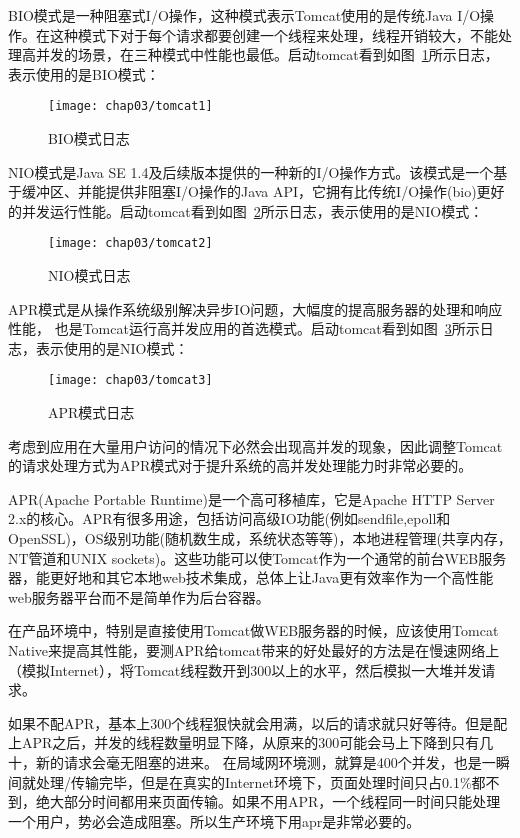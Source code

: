 BIO模式是一种阻塞式I/O操作，这种模式表示Tomcat使用的是传统Java I/O操作。在这种模式下对于每个请求都要创建一个线程来处理，线程开销较大，不能处理高并发的场景，在三种模式中性能也最低。启动tomcat看到如图~\ref{fig:tomcat1}所示日志，表示使用的是BIO模式：
\begin{figure}[H] %
  \centering
  \texttt{[image: chap03/tomcat1]}
  \caption{BIO模式日志}
  \label{fig:tomcat1}
\end{figure}
NIO模式是Java SE 1.4及后续版本提供的一种新的I/O操作方式。该模式是一个基于缓冲区、并能提供非阻塞I/O操作的Java API，它拥有比传统I/O操作(bio)更好的并发运行性能。启动tomcat看到如图~\ref{fig:tomcat2}所示日志，表示使用的是NIO模式：
\begin{figure}[H] %
  \centering
  \texttt{[image: chap03/tomcat2]}
  \caption{NIO模式日志}
  \label{fig:tomcat2}
\end{figure}
APR模式是从操作系统级别解决异步IO问题，大幅度的提高服务器的处理和响应性能， 也是Tomcat运行高并发应用的首选模式。启动tomcat看到如图~\ref{fig:tomcat3}所示日志，表示使用的是NIO模式：
\begin{figure}[H] %
  \centering
  \texttt{[image: chap03/tomcat3]}
  \caption{APR模式日志}
  \label{fig:tomcat3}
\end{figure}
考虑到应用在大量用户访问的情况下必然会出现高并发的现象，因此调整Tomcat的请求处理方式为APR模式对于提升系统的高并发处理能力时非常必要的\cite{蒋文旭2012大型高并发}。

APR(Apache Portable Runtime)是一个高可移植库，它是Apache HTTP Server 2.x的核心。APR有很多用途，包括访问高级IO功能(例如sendfile,epoll和OpenSSL)，OS级别功能(随机数生成，系统状态等等)，本地进程管理(共享内存，NT管道和UNIX sockets)。这些功能可以使Tomcat作为一个通常的前台WEB服务器，能更好地和其它本地web技术集成，总体上让Java更有效率作为一个高性能web服务器平台而不是简单作为后台容器。

在产品环境中，特别是直接使用Tomcat做WEB服务器的时候，应该使用Tomcat Native来提高其性能，要测APR给tomcat带来的好处最好的方法是在慢速网络上（模拟Internet），将Tomcat线程数开到300以上的水平，然后模拟一大堆并发请求。

如果不配APR，基本上300个线程狠快就会用满，以后的请求就只好等待。但是配上APR之后，并发的线程数量明显下降，从原来的300可能会马上下降到只有几十，新的请求会毫无阻塞的进来。
在局域网环境测，就算是400个并发，也是一瞬间就处理/传输完毕，但是在真实的Internet环境下，页面处理时间只占0.1\%都不到，绝大部分时间都用来页面传输。如果不用APR，一个线程同一时间只能处理一个用户，势必会造成阻塞。所以生产环境下用apr是非常必要的。
